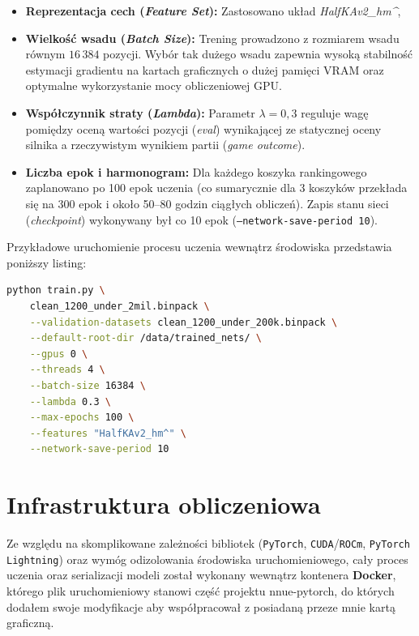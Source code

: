 \documentclass[12pt,a4paper]{report}
\begin{document}
\begin{itemize}
    \item \textbf{Reprezentacja cech (\textit{Feature Set}):} Zastosowano układ \textit{HalfKAv2\_hm\string^}, %
    \item \textbf{Wielkość wsadu (\textit{Batch Size}):} Trening prowadzono z rozmiarem wsadu równym $16\,384$ pozycji. Wybór tak dużego wsadu zapewnia wysoką stabilność estymacji gradientu na kartach graficznych o dużej pamięci VRAM oraz optymalne wykorzystanie mocy obliczeniowej GPU.
    \item \textbf{Współczynnik straty (\textit{Lambda}):} Parametr $\lambda = 0{,}3$ reguluje wagę pomiędzy oceną wartości pozycji (\textit{eval}) wynikającej ze statycznej oceny silnika a rzeczywistym wynikiem partii (\textit{game outcome}). %
    \item \textbf{Liczba epok i harmonogram:} Dla każdego koszyka rankingowego zaplanowano po 100 epok uczenia (co sumarycznie dla 3 koszyków przekłada się na 300 epok i około 50--80 godzin ciągłych obliczeń). Zapis stanu sieci (\textit{checkpoint}) wykonywany był co 10 epok (\texttt{--network-save-period 10}).
\end{itemize}

Przykładowe uruchomienie procesu uczenia wewnątrz środowiska przedstawia poniższy listing:

\begin{lstlisting}[language=bash, caption=Polecenie uruchamiające proces uczenia na pierwszym koszyku Elo]
python train.py \
    clean_1200_under_2mil.binpack \
    --validation-datasets clean_1200_under_200k.binpack \
    --default-root-dir /data/trained_nets/ \
    --gpus 0 \
    --threads 4 \
    --batch-size 16384 \
    --lambda 0.3 \
    --max-epochs 100 \
    --features "HalfKAv2_hm^" \
    --network-save-period 10
\end{lstlisting}

\section{Infrastruktura obliczeniowa}

Ze względu na skomplikowane zależności bibliotek (\texttt{PyTorch}, \texttt{CUDA}/\texttt{ROCm}, \texttt{PyTorch Lightning}) oraz wymóg odizolowania środowiska uruchomieniowego, cały proces uczenia oraz serializacji modeli został wykonany wewnątrz kontenera \textbf{Docker}, którego plik uruchomieniowy stanowi część projektu nnue-pytorch, do których dodałem swoje modyfikacje aby współpracował z posiadaną przeze mnie kartą graficzną.
\end{document}
